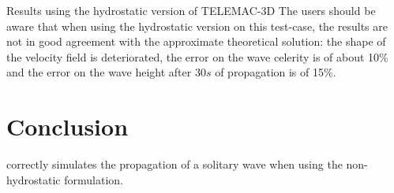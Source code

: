 \begin{WarningBlock}{Results using the hydrostatic version of TELEMAC-3D}
The users should be aware that when using the hydrostatic version on this test-case, the
results are not in good agreement with the approximate theoretical solution: the shape of the velocity field
is deteriorated, the error on the wave celerity is of about 10\% and the error on the wave height after $30s$
of propagation is of 15\%.
\end{WarningBlock}
%
\section{Conclusion}
%
 correctly simulates the propagation of a solitary wave when using the non-hydrostatic formulation.
